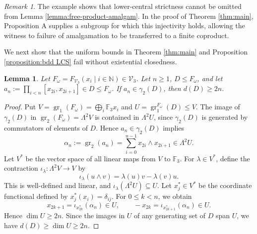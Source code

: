 \documentclass[11pt,reqno]{article}
\newtheorem{lemma}[theorem]{Lemma}
\theoremstyle{definition}
\theoremstyle{remark}
\newtheorem{remark}[theorem]{Remark}
\DeclareMathOperator{\gr}{gr}
\begin{document}
\begin{remark}
The example shows that lower-central strictness cannot be omitted
from Lemma \ref{lemma:free-product-amalgam}.
In the proof of Theorem \ref{thm:main}, Proposition A supplies a
subgroup for which this injectivity holds, allowing the witness to
failure of amalgamation to be transferred to a finite coproduct.    
\end{remark}

We next show that the uniform bounds in Theorem \ref{thm:main}
and Proposition \ref{proposition:bdd LCS} fail without
existential closedness.

\begin{lemma}\label{lemma:D can be large}
    Let $F_\omega=F_{\mathcal V_3}(x_i\mid i\in\mathbb N)\in \mathcal V_3$.
    Let $n\geq 1$, $D\leq F_\omega$, and let $a_n:=\prod_{i<n} [x_{2i},x_{2i+1}] \in D\leq F_\omega$.
    If $a_n\in \gamma_2(D)$, then $d(D)\geq 2n$.
\end{lemma}   
\begin{proof}
    Put $V=\gr_1(F_\omega)=\bigoplus_i \mathbb F_3x_i$ and $U=\gr_1^{F_\omega}(D)\leq V$.
    The image of $\gamma_2(D)$ in
    $\gr_2(F_\omega)=\Lambda^2V$
    is contained in $\Lambda^2U$, since $\gamma_2(D)$ is generated
    by commutators of elements of $D$.
    Hence $a_n\in\gamma_2(D)$ implies
    \[
        \alpha_n:=\gr_2(a_n)
        =\sum_{i=0}^{n-1}x_{2i}\wedge x_{2i+1}
        \in\Lambda^2U.
    \]
    Let $V^*$ be the vector space of all linear maps from $V$ to $\mathbb F_3$.
    For $\lambda\in V^*$, define the contraction
    $\iota_\lambda:\Lambda^2V\to V$ by
    \[
        \iota_\lambda(u\wedge v)=\lambda(u)v-\lambda(v)u.
    \]
    This is well-defined and linear, and
    $\iota_\lambda(\Lambda^2U)\subseteq U$.
    Let $x_j^*\in V^*$ be the coordinate functional defined by
    $x_j^*(x_i)=\delta_{ij}$. For $0\leq k<n$, we obtain
    \[
        x_{2k+1}=\iota_{x_{2k}^*}(\alpha_n)\in U,
        \qquad
        -x_{2k}=\iota_{x_{2k+1}^*}(\alpha_n)\in U.
    \]
    Hence $\dim U\geq2n$.
    Since the images in $U$ of any generating set of $D$ span $U$,
    we have $d(D)\geq \dim U\geq 2n$.
\end{proof}
\end{document}
